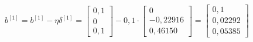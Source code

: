 \documentclass[12pt]{article}
\begin{document}
\begin{enumerate}[leftmargin=\labelsep, label=\textbf{\arabic*.)}]
\begin{itemize}
\begin{center}
                        $b^{[1]} = b^{[1]} - \eta \delta^{[1]} = \begin{bmatrix}
                                0,1 \\
                                0   \\
                                0,1
                            \end{bmatrix} - 0,1 \cdot \begin{bmatrix}
                                0        \\
                                -0,22916 \\
                                0,46150
                            \end{bmatrix} = \begin{bmatrix}
                                0,1     \\
                                0,02292 \\
                                0,05385
                            \end{bmatrix}$



                        \vspace{0.25cm}
                    \end{center}
          \end{itemize}
\end{enumerate}
\end{document}
